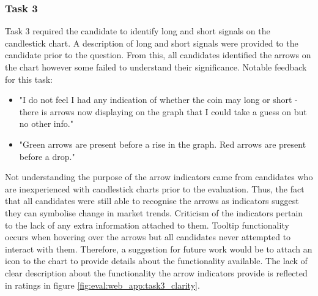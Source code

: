 

\subsubsection{Task 3}
\label{sec:evaluation:ui:tasks:q3}
\noindent Task 3 required the candidate to identify long and short signals on the candlestick chart. A description of long and short signals were provided to the candidate prior to the question. From this, all candidates identified the arrows on the chart however some failed to understand their significance. Notable feedback for this task:
\begin{itemize}
    \item "I do not feel I had any indication of whether the coin may long or short - there is arrows now displaying on the graph that I could take a guess on but no other info."
    \item "Green arrows are present before a rise in the graph. Red arrows are present before a drop."
\end{itemize}
Not understanding the purpose of the arrow indicators came from candidates who are inexperienced with candlestick charts prior to the evaluation. Thus, the fact that all candidates were still able to recognise the arrows as indicators suggest they can symbolise change in market trends. Criticism of the indicators pertain to the lack of any extra information attached to them. Tooltip functionality occurs when hovering over the arrows but all candidates never attempted to interact with them. Therefore, a suggestion for future work would be to attach an icon to the chart to provide details about the functionality available. The lack of clear description about the functionality the arrow indicators provide is reflected in ratings in figure \ref{fig:eval:web_app:task3_clarity}. 


